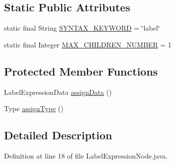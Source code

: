 \subsection*{Static Public Attributes}
\begin{DoxyCompactItemize}
\item 
static final String \hyperlink{classit_1_1emarolab_1_1cagg_1_1core_1_1language_1_1syntax_1_1expressionTree_1_1expressionNodeType_1_1LabelExpressionNode_ab371494b9533af339e0fc22da6c51d50}{S\-Y\-N\-T\-A\-X\-\_\-\-K\-E\-Y\-W\-O\-R\-D} = \char`\"{}label\char`\"{}
\item 
static final Integer \hyperlink{classit_1_1emarolab_1_1cagg_1_1core_1_1language_1_1syntax_1_1expressionTree_1_1expressionNodeType_1_1LabelExpressionNode_af29da3e11c20f061af00e59f91e49572}{M\-A\-X\-\_\-\-C\-H\-I\-L\-D\-R\-E\-N\-\_\-\-N\-U\-M\-B\-E\-R} = 1
\end{DoxyCompactItemize}
\subsection*{Protected Member Functions}
\begin{DoxyCompactItemize}
\item 
Label\-Expression\-Data \hyperlink{classit_1_1emarolab_1_1cagg_1_1core_1_1language_1_1syntax_1_1expressionTree_1_1expressionNodeType_1_1LabelExpressionNode_a28be264cf1e1124fc5d70fd9d837addf}{assign\-Data} ()
\item 
Type \hyperlink{classit_1_1emarolab_1_1cagg_1_1core_1_1language_1_1syntax_1_1expressionTree_1_1expressionNodeType_1_1LabelExpressionNode_af615c3bff1e3ab1158a2764dfc243507}{assign\-Type} ()
\end{DoxyCompactItemize}


\subsection{Detailed Description}


Definition at line 18 of file Label\-Expression\-Node.\-java.



